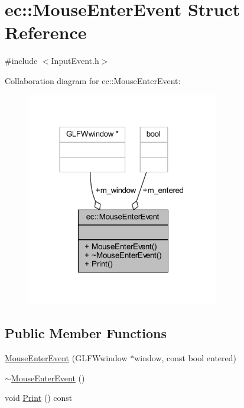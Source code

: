 \hypertarget{structec_1_1_mouse_enter_event}{}\section{ec\+:\+:Mouse\+Enter\+Event Struct Reference}
\label{structec_1_1_mouse_enter_event}


{\ttfamily \#include $<$Input\+Event.\+h$>$}



Collaboration diagram for ec\+:\+:Mouse\+Enter\+Event\+:\nopagebreak
\begin{figure}[H]
\begin{center}
\leavevmode
\includegraphics[width=238pt]{structec_1_1_mouse_enter_event__coll__graph}
\end{center}
\end{figure}
\subsection*{Public Member Functions}
\begin{DoxyCompactItemize}
\item 
\mbox{\hyperlink{structec_1_1_mouse_enter_event_a8683590d2b99dbb3bf3db3cd50951797}{Mouse\+Enter\+Event}} (G\+L\+F\+Wwindow $\ast$window, const bool entered)
\item 
\mbox{\hyperlink{structec_1_1_mouse_enter_event_accbd4fca68e8e582493fa3d636b9d293}{$\sim$\+Mouse\+Enter\+Event}} ()
\item 
void \mbox{\hyperlink{structec_1_1_mouse_enter_event_a341f8c9ee2ee87e4f8c74af90c2fe29d}{Print}} () const
\end{DoxyCompactItemize}
